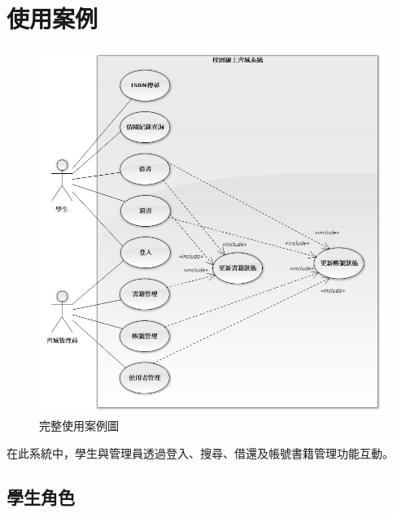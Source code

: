 \chapter{使用案例}

\begin{figure}[ht]
    \centering
    \includegraphics[width=\linewidth]{image/使用案例.png}
    \captionsetup{justification=centering}
    \caption{完整使用案例圖}
\end{figure}

在此系統中，學生與管理員透過登入、搜尋、借還及帳號書籍管理功能互動。

\clearpage

\section{學生角色}

